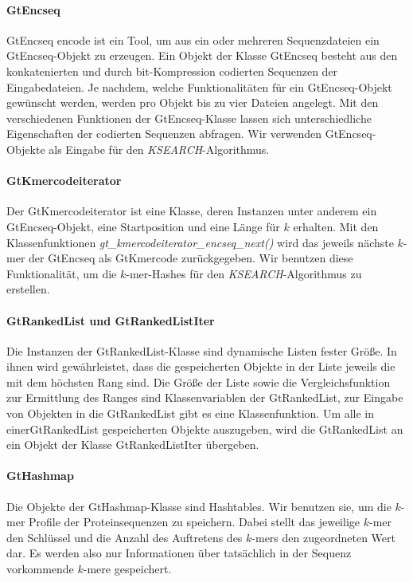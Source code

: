 \documentclass{article}
\begin{document}
\paragraph{GtEncseq}
GtEncseq encode ist ein Tool, um aus ein oder mehreren Sequenzdateien ein
GtEncseq-Objekt zu erzeugen. Ein Objekt der Klasse GtEncseq besteht aus den
konkatenierten und durch bit-Kompression codierten Sequenzen der Eingabedateien.
Je nachdem, welche Funktionalitäten für ein GtEncseq-Objekt gewünscht werden, werden pro Objekt bis zu vier Dateien angelegt. Mit den verschiedenen Funktionen der GtEncseq-Klasse lassen sich unterschiedliche Eigenschaften der codierten Sequenzen abfragen. Wir verwenden GtEncseq-Objekte als Eingabe für den \emph{KSEARCH}-Algorithmus.

\paragraph{GtKmercodeiterator}
Der GtKmercodeiterator ist eine Klasse, deren Instanzen unter anderem ein GtEncseq-Objekt, eine Startposition und eine Länge für $k$ erhalten. Mit den Klassenfunktionen \emph{gt\_kmercodeiterator\_encseq\_next()} wird das jeweils nächste $k$-mer der GtEncseq als GtKmercode zurückgegeben. Wir benutzen diese Funktionalität, um die $k$-mer-Hashes für den \emph{KSEARCH}-Algorithmus zu erstellen.

\paragraph{GtRankedList und GtRankedListIter}
Die Instanzen der GtRankedList-Klasse sind dynamische Listen fester Größe. In ihnen wird gewährleistet, dass die gespeicherten Objekte in der Liste jeweils die mit dem höchsten Rang sind. Die Größe der Liste sowie die Vergleichsfunktion zur Ermittlung des Ranges sind Klassenvariablen der GtRankedList, zur Eingabe von Objekten in die GtRankedList gibt es eine Klassenfunktion. Um alle in einerGtRankedList gespeicherten Objekte auszugeben, wird die GtRankedList an ein Objekt der Klasse GtRankedListIter übergeben.

\paragraph{GtHashmap}
Die Objekte der GtHashmap-Klasse sind Hashtables. Wir benutzen sie, um die $k$-mer
Profile der Proteinsequenzen zu speichern. Dabei stellt das jeweilige $k$-mer den
Schlüssel und die Anzahl des Auftretens des $k$-mers den zugeordneten Wert dar. Es
werden also nur Informationen über tatsächlich in der Sequenz vorkommende $k$-mere
gespeichert.
\end{document}
